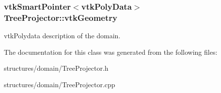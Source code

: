\subsubsection[{\texorpdfstring{vtk\+Geometry}{vtkGeometry}}]{\setlength{\rightskip}{0pt plus 5cm}vtk\+Smart\+Pointer$<$vtk\+Poly\+Data$>$ Tree\+Projector\+::vtk\+Geometry\hspace{0.3cm}{\ttfamily [private]}}\hypertarget{class_tree_projector_aca0dc09b8d4f959028f28e13f10d09f6}{}\label{class_tree_projector_aca0dc09b8d4f959028f28e13f10d09f6}
vtk\+Polydata description of the domain. 

The documentation for this class was generated from the following files\+:\begin{DoxyCompactItemize}
\item 
structures/domain/Tree\+Projector.\+h\item 
structures/domain/Tree\+Projector.\+cpp\end{DoxyCompactItemize}
